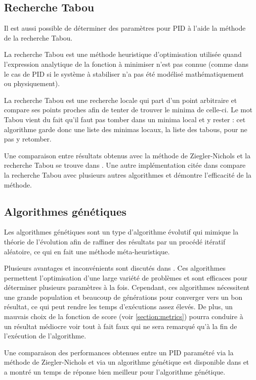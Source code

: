 \documentclass[a4paper,10pt]{report}
\begin{document}
\subsection{Recherche Tabou}

Il est aussi possible de déterminer des paramètres pour PID à l'aide la méthode de la recherche Tabou.

La recherche Tabou est une méthode heuristique d'optimisation utilisée quand l'expression analytique de la fonction à minimiser n'est pas connue
(comme dans le cas de PID si le système à stabiliser n'a pas été modélisé mathématiquement ou physiquement).

La recherche Tabou est une recherche locale qui part d'un point arbitraire et compare ses points proches afin de tenter de trouver le minima de celle-ci.
Le mot Tabou vient du fait qu'il faut pas tomber dans un minima local et y rester :
cet algorithme garde donc une liste des minimas locaux, la liste des tabous, pour ne pas y retomber.

Une comparaison entre résultats obtenus avec la méthode de Ziegler-Nichols et la recherche Tabou se trouve dans \cite{Karaboga569754}.
Une autre implémentation citée dans \cite{bagis2011tabu} compare la recherche Tabou avec plusieurs autres algorithmes et démontre l'efficacité de la méthode.

\subsection{Algorithmes génétiques}

Les algorithmes génétiques sont un type d'algorithme évolutif qui mimique la théorie de l'évolution afin de raffiner des résultats par un procédé itératif aléatoire, ce qui en fait une méthode méta-heuristique.

Plusieurs avantages et inconvénients sont discutés dans \cite{Tabassum2014}.
Ces algorithmes permettent l'optimisation d'une large variété de problèmes et sont efficaces pour déterminer plusieurs paramètres à la fois.
Cependant, ces algorithmes nécessitent une grande population et beaucoup de générations pour converger vers un bon résultat, ce qui peut rendre les temps d'exécutions assez élevés.
De plus, un mauvais choix de la fonction de score (voir \ref{section:metrics}) pourra conduire à un résultat médiocre voir tout à fait faux qui ne sera remarqué qu'à la fin de l'exécution de l'algorithme.

Une comparaison des performances obtenues entre un PID paramétré via la méthode de Ziegler-Nichols et via un algorithme génétique est disponible dans \cite{thomas2009position} et a montré un temps de réponse bien meilleur pour l'algorithme génétique.
\end{document}

